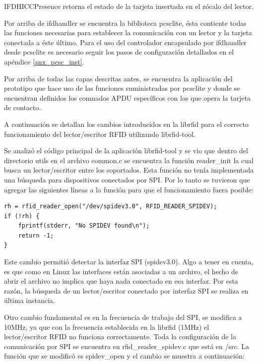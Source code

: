 IFDHICCPresence retorna el estado de la tarjeta insertada en el zócalo del lector.

\bigskip
{}
Por arriba de ifdhandler se encuentra la biblioteca pcsclite, ésta contiente todas las funciones necesarias para establecer la comunicación con un lector y la tarjeta conectada a éste último. Para el uso del controlador encapsulado por ifdhandler desde pcsclite es necesario seguir los pasos de configuración detallados en el apéndice \ref{anx_pcsc_inst}.

\bigskip
{}
Por arriba de todas las capas descritas antes, se encuentra la aplicación del prototipo que hace uso de las funciones suministradas por pcsclite y donde se encuentran definidos los comnados APDU específicos con los que opera la tarjeta de contacto.


\bigskip
{}
A continuación se detallan los cambios introducidos en la librfid para el correcto funcionamiento del lector/escritor RFID utilizando librfid-tool.

\bigskip
Se analizó el código principal de la aplicación librfid-tool y se vio que dentro del directorio utils en el archivo common.c se encuentra la función reader\_init la cual busca un lector/escritor entre los soportados. Esta función no tenía implementada una búsqueda para dispositivos conectados por SPI. Por lo tanto se tuvieron que agregar las siguientes líneas a la función para que el funcionamiento fuera posible:

\begin{verbatim}
rh = rfid_reader_open("/dev/spidev3.0", RFID_READER_SPIDEV);
if (!rh) {
    fprintf(stderr, "No SPIDEV found\n");
    return -1;
}
\end{verbatim}

Este cambio permitió detectar la interfaz SPI (spidev3.0). Algo a tener en cuenta, es que como en Linux las interfaces están asociadas a un archivo, el hecho de abrir el archivo no implica que haya nada conectado en esa interfaz. Por esta razón, la búsqueda de un lector/escritor conectado por interfaz SPI se realiza en última instancia.

\bigskip
Otro cambio fundamental es en la frecuencia de trabajo del SPI, se modifica a 10MHz, ya que con la frecuencia establecida en la librfid (1MHz) el lector/escritor RFID no funciona correctamente. Toda la configuración de la comunicación por SPI se encuentra en rfid\_reader\_spidev.c que está en /src.
La función que se modificó es spidev\_open y el cambio se muestra a continuación:

